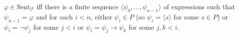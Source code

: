 $\varphi \in \text{Sent}_{\mathcal{P}}$ iff there is a finite sequence $\langle \psi_0, \ldots, \psi_{n-1} \rangle$ of expressions such that $\psi_{n-1} = \varphi$ and for each $i < n$, either $\psi_i \in P$ (so $\psi_i = \langle s \rangle$ for some $s \in P$) or $\psi_i = \neg \psi_j$ for some $j < i$ or $\psi_i = \psi_j \rightarrow \psi_k$ for some $j, k < i$.